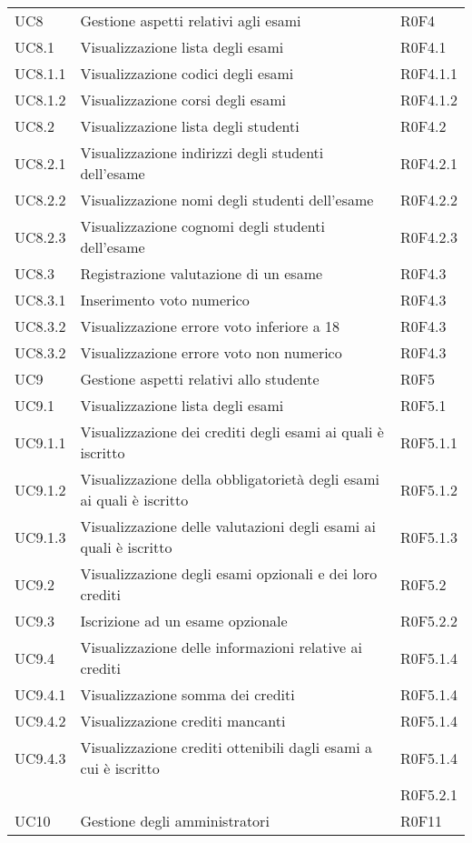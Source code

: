 \documentclass[AnalisiDeiRequisiti.tex]{subfiles}
\begin{document}
\begin{longtable}[H]{p{2cm}p{5cm}p{5cm}}
	
	UC8 & Gestione aspetti relativi agli esami & R0F4 \\
	UC8.1 & Visualizzazione lista degli esami & R0F4.1 \\
	UC8.1.1 & Visualizzazione codici degli esami & R0F4.1.1 \\
	UC8.1.2 & Visualizzazione corsi degli esami & R0F4.1.2 \\
	UC8.2 & Visualizzazione lista degli studenti & R0F4.2  \\
	UC8.2.1 & Visualizzazione indirizzi degli studenti dell'esame & R0F4.2.1 \\
	UC8.2.2 & Visualizzazione nomi degli studenti dell'esame & R0F4.2.2 \\
	UC8.2.3 & Visualizzazione cognomi degli studenti dell'esame & R0F4.2.3 \\
	UC8.3 & Registrazione valutazione di un esame & R0F4.3 \\
	UC8.3.1 & Inserimento voto numerico & R0F4.3 \\
	UC8.3.2 & Visualizzazione errore voto inferiore a 18 & R0F4.3 \\
	UC8.3.2 & Visualizzazione errore voto non numerico & R0F4.3 \\
	UC9 & Gestione aspetti relativi allo studente & R0F5 \\
	UC9.1 & Visualizzazione lista degli esami & R0F5.1 \\
	UC9.1.1 & Visualizzazione dei crediti degli esami ai quali è iscritto & R0F5.1.1 \\
	UC9.1.2 & Visualizzazione della obbligatorietà degli esami ai quali è iscritto & R0F5.1.2 \\
	UC9.1.3 & Visualizzazione delle valutazioni degli esami ai quali è iscritto	& R0F5.1.3 \\
	UC9.2 & Visualizzazione degli esami opzionali e dei loro crediti & R0F5.2 \\
	UC9.3 & Iscrizione ad un esame opzionale & R0F5.2.2 \\
	UC9.4 & Visualizzazione delle informazioni relative ai crediti & R0F5.1.4 \\ 
	UC9.4.1 & Visualizzazione somma dei crediti & R0F5.1.4 \\ 
	UC9.4.2 & Visualizzazione crediti mancanti & R0F5.1.4 \\ 
	UC9.4.3 & Visualizzazione crediti ottenibili dagli esami a cui è iscritto & R0F5.1.4 \\ 
	& & R0F5.2.1 \\
	UC10 & Gestione degli amministratori & R0F11 \\

\end{longtable}
\end{document}
